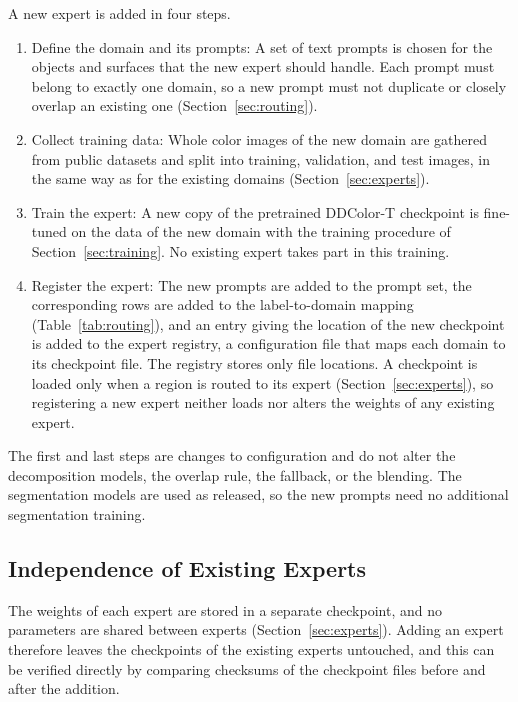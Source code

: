 \documentclass{FastFyp}
\begin{document}
A new expert is added in four steps.

\begin{enumerate}
    \item Define the domain and its prompts: A set of text prompts is chosen for the objects and surfaces that the new expert should handle. Each prompt must belong to exactly one domain, so a new prompt must not duplicate or closely overlap an existing one (Section~\ref{sec:routing}).
    \item Collect training data: Whole color images of the new domain are gathered from public datasets and split into training, validation, and test images, in the same way as for the existing domains (Section~\ref{sec:experts}).
    \item Train the expert: A new copy of the pretrained DDColor-T checkpoint is fine-tuned on the data of the new domain with the training procedure of Section~\ref{sec:training}. No existing expert takes part in this training.
    \item Register the expert: The new prompts are added to the prompt set, the corresponding rows are added to the label-to-domain mapping (Table~\ref{tab:routing}), and an entry giving the location of the new checkpoint is added to the expert registry, a configuration file that maps each domain to its checkpoint file. The registry stores only file locations. A checkpoint is loaded only when a region is routed to its expert (Section~\ref{sec:experts}), so registering a new expert neither loads nor alters the weights of any existing expert.
\end{enumerate}

The first and last steps are changes to configuration and do not alter the decomposition models, the overlap rule, the fallback, or the blending. The segmentation models are used as released, so the new prompts need no additional segmentation training.

\subsection{Independence of Existing Experts}

The weights of each expert are stored in a separate checkpoint, and no parameters are shared between experts (Section~\ref{sec:experts}). Adding an expert therefore leaves the checkpoints of the existing experts untouched, and this can be verified directly by comparing checksums of the checkpoint files before and after the addition.
\end{document}
